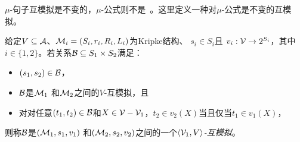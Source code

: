 %	
%	
%	
%	
%		
%	

$\mu$-句子互模拟是不变的，$\mu$-公式则不是~\cite{janin1996expressive}。这里定义一种对$\mu$-公式是不变的互模拟。

\begin{definition}[变元-命题-互模拟]
	给定$V \subseteq {\cal A}$、${\cal M}_i = (S_i, r_i, R_i, L_i)$为Kripke结构、 $s_i\in S_i$且
	$v_i: {\cal V} \rightarrow 2^{S_i}$，其中$i\in\{1,2\}$。若关系${\cal B}\subseteq S_1 \times S_2$满足：
	\begin{itemize}
		\item $(s_1,s_2)\in{\cal B}$，
		\item ${\cal B}$是${\cal M}_1$ 和${\cal M}_2$之间的$V$-互模拟，且
		\item 对对任意$(t_1,t_2)\in {\cal B}$和$X  \in {\cal V}-{\cal V}_1$，$t_2\in v_2(X)$当且仅当$t_1 \in v_1(X)$，
	\end{itemize}	
则称${\cal B}$是$({\cal M}_1,s_1, v_1)$ 和$({\cal M}_2,s_2, v_2)$之间的一个{\em ${\langle{{\cal V}_1, V}\rangle}$-互模拟}。
\end{definition}
%


